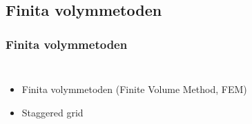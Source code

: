 \subsection{Finita volymmetoden}


\begin{frame}
\frametitle{Finita volymmetoden}
\begin{columns}[c]

\begin{itemize}[<+(1)->]
\item Finita volymmetoden (Finite Volume Method, FEM)
    \setcounter{fvmpauses}{\thebeamerpauses}
\item Staggered grid
    \setcounter{staggeredpauses}{\thebeamerpauses}
\end{itemize}



\end{columns}
\end{frame}
